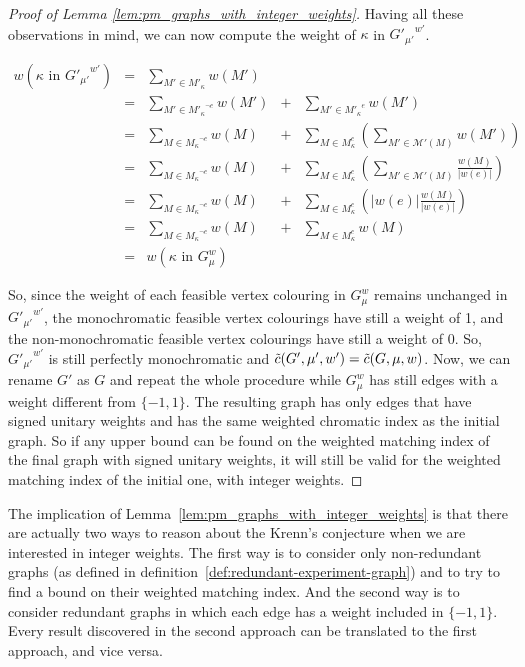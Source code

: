 \begin{proof}[Proof of Lemma \ref{lem:pm_graphs_with_integer_weights}]
    Having all these observations in mind, we can now compute the weight of $\kappa$ in ${G'_{\mu'}}^{w'}$.

    \begin{center}
        $\begin{array}{lclcl}
            w(\kappa \mbox{ in } {G'_{\mu'}}^{w'})
                & = & \sum\limits_{M' \in M'_{\kappa}} w(M') \\
                & = & \sum\limits_{M' \in {M'_{\kappa}}^{\neg e}} w(M') & + & \sum\limits_{M' \in {M'_{\kappa}}^{e}} w(M') \\
                & = & \sum\limits_{M \in {M_{\kappa}}^{\neg e}} w(M)    & + & \sum\limits_{M \in M_{\kappa}^e} \left( \sum\limits_{M' \in \mathcal{M}'(M)} w(M') \right) \\
                & = & \sum\limits_{M \in {M_{\kappa}}^{\neg e}} w(M)    & + & \sum\limits_{M \in M_{\kappa}^e} \left( \sum\limits_{M' \in \mathcal{M}'(M)} \frac{w(M)}{|w(e)|} \right) \\
                & = & \sum\limits_{M \in {M_{\kappa}}^{\neg e}} w(M)    & + & \sum\limits_{M \in M_{\kappa}^e} \left( |w(e)| \frac{w(M)}{|w(e)|} \right) \\
                & = & \sum\limits_{M \in {M_{\kappa}}^{\neg e}} w(M)    & + & \sum\limits_{M \in M_{\kappa}^e} w(M) \\
                & = & w(\kappa \mbox{ in } G_\mu^w)
        \end{array}$
    \end{center}

    So, since the weight of each feasible vertex colouring in $G_\mu^w$ remains unchanged in ${G'_{\mu'}}^{w'}$, the monochromatic feasible vertex colourings have still a weight of 1, and the non-monochromatic feasible vertex colourings have still a weight of 0.
    So, ${G'_{\mu'}}^{w'}$ is still perfectly monochromatic and $\Tilde{c}(G', \mu', w') = \Tilde{c}(G, \mu, w)$.
    Now, we can rename $G'$ as $G$ and repeat the whole procedure while $G_\mu^w$ has still edges with a weight different from $\{-1, 1\}$.
    The resulting graph has only edges that have signed unitary weights and has the same weighted chromatic index as the initial graph.
    So if any upper bound can be found on the weighted matching index of the final graph with signed unitary weights, it will still be valid for the weighted matching index of the initial one, with integer weights.
\end{proof}

The implication of Lemma~\ref{lem:pm_graphs_with_integer_weights} is that there are actually two ways to reason about the Krenn's conjecture when we are interested in integer weights.
The first way is to consider only non-redundant graphs (as defined in definition~\ref{def:redundant-experiment-graph}) and to try to find a bound on their weighted matching index.
And the second way is to consider redundant graphs in which each edge has a weight included in $\{-1, 1\}$.
Every result discovered in the second approach can be translated to the first approach, and vice versa.



